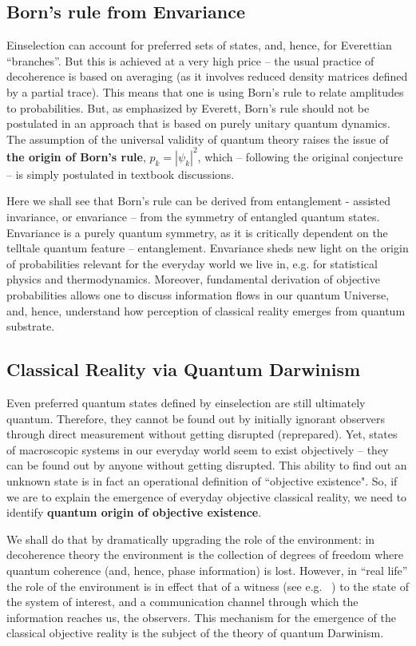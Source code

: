 \documentclass[aps,amsmath,amssymb,amsfonts,12pt]{revtex4-1}
\newcommand{\+}         {\dagger}
\begin{document}
\subsection{Born's rule from Envariance}

Einselection can account for preferred sets of states, and, hence, for Everettian ``branches''. But this
is achieved at a very high price -- the usual practice of decoherence
is based on averaging (as it involves reduced density matrices defined by a partial trace). This means that
one is using Born's rule to relate amplitudes to probabilities. But, as emphasized by Everett, Born's rule
should not be postulated in an approach that is based on purely unitary quantum dynamics. The assumption of the
universal validity of quantum theory raises the issue of {\bf the origin of Born's rule},
$p_k = |\psi_k|^2$, which -- following the original conjecture \cite{12} -- is simply postulated in textbook discussions.

Here we shall see that Born's rule can be derived from entanglement - assisted invariance, or envariance -- from the symmetry of entangled quantum states. Envariance is a purely quantum symmetry, as it is critically dependent on the telltale quantum feature -- entanglement. Envariance sheds new light on the origin of probabilities relevant for the everyday world we live in, e.g. for statistical physics and thermodynamics. 
Moreover, fundamental derivation of objective probabilities allows one to discuss information flows in our quantum Universe, and, hence, understand how perception of classical reality emerges from quantum substrate.

\subsection{Classical Reality via Quantum Darwinism}

Even preferred quantum states defined by einselection are still ultimately quantum. Therefore, they
cannot be found out by initially ignorant observers through direct measurement without getting
disrupted (reprepared). Yet, states of macroscopic systems in our everyday world seem to exist objectively
-- they can be found out by anyone without getting disrupted. This ability to find out an unknown
state is in fact an operational definition of  ``objective existence". So, if we are to explain the
emergence of everyday objective classical reality, we need to identify {\bf quantum origin of objective existence}.

We shall do that by dramatically upgrading the role of the environment: in decoherence theory the
environment is the collection of degrees of freedom where quantum coherence (and, hence,
phase information) is lost. However, in ``real life'' the role of the environment is in effect that of a witness (see e.g. ~\cite{Z00,75}) to the state of the
system of interest, and a communication channel through which the information
reaches us, the observers. This mechanism for the emergence of the classical objective reality is the subject of the theory of quantum Darwinism.
\end{document}
